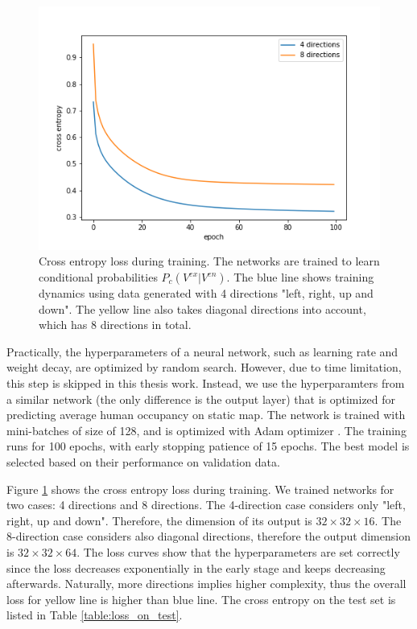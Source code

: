 \begin{figure}[hp]
\includegraphics[width=.7\textwidth]{figures/training_hist.png}
\caption[Cross entropy loss during network training.]{Cross entropy loss during training. The networks are trained to learn conditional probabilities \( P_c(V^{ex} | V^{en}) \). The blue line shows training dynamics using data generated with 4 directions "left, right, up and down". The yellow line also takes diagonal directions into account, which has 8 directions in total. }
\label{fig:trainning}

\end{figure}

Practically, the hyperparameters of a neural network, such as learning rate and weight decay, are optimized by random search. However, due to time limitation, this step is skipped in this thesis work. Instead, we use the hyperparamters from a similar network (the only difference is the output layer) that is optimized for predicting average human occupancy on static map. The network is trained with mini-batches of size of 128, and  is optimized with Adam optimizer \citep{Kingma2014Adam}. The training runs for 100 epochs, with early stopping patience of 15 epochs. The best model is selected based on their performance on validation data.

 Figure \ref{fig:trainning} shows the cross entropy loss during training. We trained networks for two cases: 4 directions and 8 directions. The 4-direction case considers only "left, right, up and down". Therefore, the dimension of its output is $32 \times 32 \times 16$. The 8-direction case considers also diagonal directions, therefore the output dimension is $32 \times 32 \times 64$. The loss curves show that the hyperparameters are set correctly since the loss decreases exponentially in the early stage and keeps decreasing afterwards. Naturally, more directions implies higher complexity, thus the overall loss for yellow line is higher than blue line. The cross entropy on the test set is listed in Table \ref{table:loss_on_test}.

